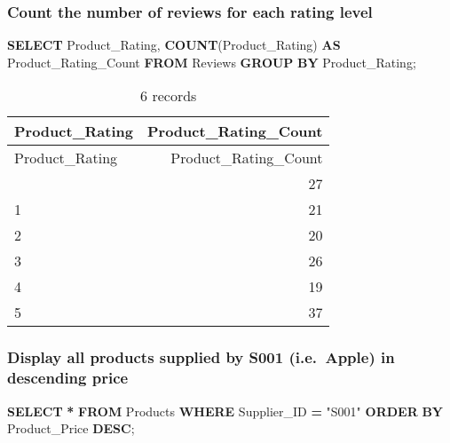 \documentclass[
]{article}
\newenvironment{Shaded}{\begin{snugshade}}{\end{snugshade}}
\newcommand{\FunctionTok}[1]{\textcolor[rgb]{0.13,0.29,0.53}{\textbf{#1}}}
\newcommand{\KeywordTok}[1]{\textcolor[rgb]{0.13,0.29,0.53}{\textbf{#1}}}
\newcommand{\NormalTok}[1]{#1}
\newcommand{\OperatorTok}[1]{\textcolor[rgb]{0.81,0.36,0.00}{\textbf{#1}}}
\newcommand{\OtherTok}[1]{\textcolor[rgb]{0.56,0.35,0.01}{#1}}
\begin{document}
\hypertarget{count-the-number-of-reviews-for-each-rating-level}{%
\subsubsection{Count the number of reviews for each rating
level}\label{count-the-number-of-reviews-for-each-rating-level}}

\begin{Shaded}
\begin{Highlighting}[]

\KeywordTok{SELECT}\NormalTok{ Product\_Rating, }\FunctionTok{COUNT}\NormalTok{(Product\_Rating) }\KeywordTok{AS}\NormalTok{ Product\_Rating\_Count}
\KeywordTok{FROM}\NormalTok{ Reviews}
\KeywordTok{GROUP} \KeywordTok{BY}\NormalTok{ Product\_Rating;}
\end{Highlighting}
\end{Shaded}

\begin{longtable}[]{@{}lr@{}}
\caption{6 records}\tabularnewline
\toprule\noalign{}
Product\_Rating & Product\_Rating\_Count \\
\midrule\noalign{}
\endfirsthead
\toprule\noalign{}
Product\_Rating & Product\_Rating\_Count \\
\midrule\noalign{}
\endhead
\bottomrule\noalign{}
\endlastfoot
0 & 27 \\
1 & 21 \\
2 & 20 \\
3 & 26 \\
4 & 19 \\
5 & 37 \\
\end{longtable}

\hypertarget{display-all-products-supplied-by-s001-i.e.-apple-in-descending-price}{%
\subsubsection{Display all products supplied by S001 (i.e.~Apple) in
descending
price}\label{display-all-products-supplied-by-s001-i.e.-apple-in-descending-price}}

\begin{Shaded}
\begin{Highlighting}[]

\KeywordTok{SELECT} \OperatorTok{*}
\KeywordTok{FROM}\NormalTok{ Products }
\KeywordTok{WHERE}\NormalTok{ Supplier\_ID }\OperatorTok{=} \OtherTok{"S001"}
\KeywordTok{ORDER} \KeywordTok{BY}\NormalTok{ Product\_Price }\KeywordTok{DESC}\NormalTok{;}
\end{Highlighting}
\end{Shaded}
\end{document}
